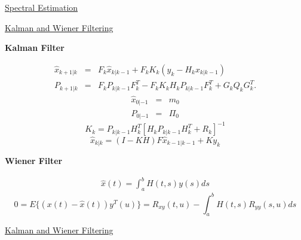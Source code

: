 \begin{slide}
{}
{\tiny\underline{Spectral Estimation}}
\vfill
\vbox{
}
\vfill
\end{slide}
\begin{slide}
{}
{\tiny\underline{Kalman and Wiener Filtering}}
\begin{center}
{\bf Kalman Filter}
\end{center}
\vfill
\vbox{
{\tiny
%
\begin{eqnarray}
\hat{x}_{k+1|k}&=&F_k\hat{x}_{k|k-1}+F_kK_k(y_k-H_k\hat{x}_{k|k-1})\nonumber\\
P_{k+1|k}&=&F_kP_{k|k-1}F_k^T-F_kK_kH_kP_{k|k-1}F_k^T+G_kQ_kG_k^T.
\end{eqnarray}
%
\vfil
%
\begin{eqnarray}
\hat{x}_{0|-1}&=&m_0\nonumber\\
P_{0|-1}&=&\Pi_0
\end{eqnarray}
%
\vfil
%
$$
K_k=P_{k|k-1}H_k^T[H_kP_{k|k-1}H_k^T+R_k]^{-1}
$$
%
\vfil
%
$$
\hat{x}_{k|k}=(I-KH)F\hat{x}_{k-1|k-1}+Ky_k
$$
%
}}
\vfill
\begin{center}
{\bf Wiener Filter}
\end{center}
\vfill
\vbox{
{\tiny
%
\begin{eqnarray}
\hat{x}(t)=\int_{a}^{b}H(t,s)y(s)ds
\end{eqnarray}
%
\vfil
%
$$
0=E\{(x(t)-\hat{x}(t))y^T(u)\}=R_{xy}(t,u)-\int_{a}^{b}H(t,s)R_{yy}(s,u)ds
$$
%
}}
\vfill
\end{slide}
\begin{slide}
{}
{\tiny\underline{Kalman and Wiener Filtering}}
\vfill
\vbox{
}
\vfill
\end{slide}
